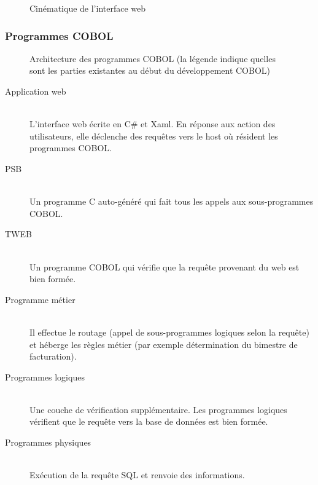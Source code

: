 \documentclass[a4paper,french,8pt]{article}
\begin{document}
			\begin{figure}[h!]
			\caption{Cinématique de l'interface web}
			\centering
			\end{figure} 
		
		
		\subsubsection{Programmes COBOL} 
		
			\begin{figure}[h!]
			\caption{Architecture des programmes COBOL (la légende indique quelles sont les parties existantes au début du développement COBOL)}
			\centering
			\end{figure}
			
			\begin{description}
				 \item[Application web] \hfill \\
				 L'interface web écrite en C\# et Xaml. En réponse aux action des utilisateurs, elle déclenche des requêtes vers le host où résident les programmes COBOL.
				 
				 \item[PSB] \hfill \\
				 Un programme C auto-généré qui fait tous les appels aux sous-programmes COBOL.
				 
				 \item[TWEB] \hfill \\
				 Un programme COBOL qui vérifie que la requête provenant du web est bien formée.
				 
				 \item[Programme métier] \hfill \\
				 Il effectue le routage (appel de sous-programmes logiques selon la requête) et héberge les règles métier (par exemple détermination du bimestre de facturation).
				 
				 \item[Programmes logiques] \hfill \\
				 Une couche de vérification supplémentaire. Les programmes logiques vérifient que le requête vers la base de données est bien formée.
				 
				 \item[Programmes physiques] \hfill \\
				 Exécution de la requête SQL et renvoie des informations.			 			 
			\end{description}
			
\end{document}
